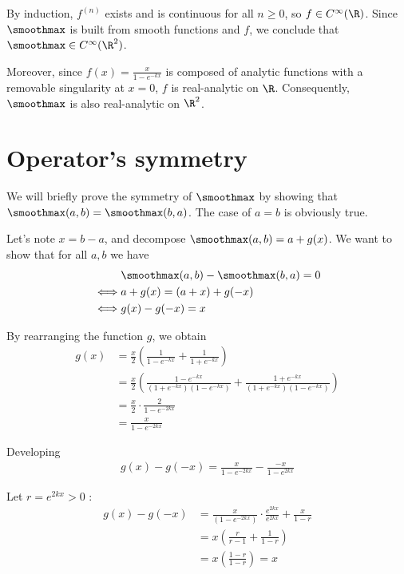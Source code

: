 By induction, $f^{(n)}$ exists and is continuous for all $n \geq 0$, so $f \in C^\infty(\R)$. Since $\smoothmax$ is built from smooth functions and $f$, we conclude that $\smoothmax \in C^\infty(\R^2)$.

\smallConclusion

Moreover, since $f(x) = \frac{x}{1 - e^{-kx}}$ is composed of analytic functions with a removable singularity at $x = 0$, $f$ is real-analytic on $\R$. Consequently, $\smoothmax$ is also real-analytic on $\R^2$.

\section{Operator's symmetry}
We will briefly prove the symmetry of $\smoothmax$ by showing that $\smoothmax(a, b) = \smoothmax(b, a)$. The case of $a = b$ is obviously true.

Let's note $x = b - a$, and decompose $\smoothmax(a, b) = a + g(x)$. We want to show that for all $a, b$ we have
\begin{align}
    & \smoothmax(a, b) - \smoothmax(b, a) = 0 \\
    \iff& a + g(x) = (a + x) + g(-x) \\
    \iff& g(x) - g(-x) = x
\end{align}

By rearranging the function $g$, we obtain 
\begin{align}
    g(x) &= \frac{x}{2} \left( \frac{1}{1 - e^{-kx}} + \frac{1}{1 + e^{-kx}} \right) \\
    &= \frac{x}{2} \left( \frac{1 - e^{-kx}}{(1 + e^{-kx})(1 - e^{-kx})} + \frac{1 + e^{-kx}}{(1 + e^{-kx})(1 - e^{-kx})} \right) \\
    &= \frac{x}{2} \cdot \frac{2}{1 - e^{-2kx}} \\
    &= \frac{x}{1 - e^{-2kx}}
\end{align}


Developing
\begin{align}
    g(x) - g(-x) = \frac{x}{1 - e^{-2kx}} - \frac{-x}{1 - e^{2kx}}
\end{align}

Let $r = e^{2kx} > 0$ :
\begin{align}
    g(x) - g(-x) &= \frac{x}{(1 - e^{-2kx})} \cdot \frac{e^{2kx}}{e^{2kx}} + \frac{x}{1 - r} \\
    &= x \left( \frac{r}{r - 1} + \frac{1}{1 - r} \right) \\
    &= x \left( \frac{1 - r}{1 - r} \right) = x
\end{align}

